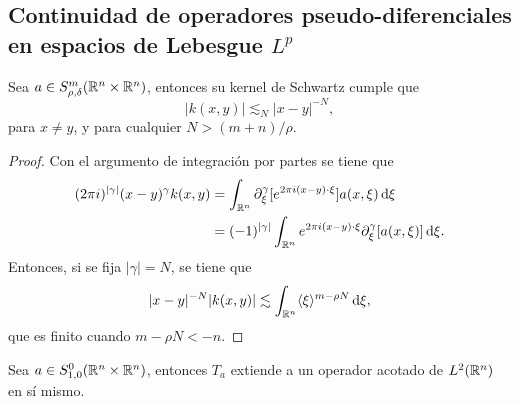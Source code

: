 \subsection{Continuidad de operadores pseudo-diferenciales en espacios de Lebesgue $L^p$}
\begin{theorem}\label{theo:kernel-estimates}
	Sea $a\in S^m_{\rho,\delta}(\mathbb{R}^n\times\mathbb{R}^n)$, entonces su kernel de Schwartz cumple que 
	\begin{equation*}
		|k(x, y)| \lesssim_N |x-y|^{-N},
	\end{equation*}
	para $x\neq y$, y para cualquier $N>(m+n)/\rho$. 
\end{theorem}
\begin{proof}
	Con el argumento de integración por partes se tiene que 
	\begin{align*}
		(2\pi i)^{|\gamma|} (x-y)^\gamma k(x, y) & = 
		\int_{\mathbb{R}^n} \partial^\gamma_\xi [e^{2\pi i (x-y)\cdot\xi}]a(x, \xi) \mathop{}\!\mathrm{d} \xi \\
		& = (-1)^{|\gamma|} \int_{\mathbb{R}^n} e^{2\pi i (x-y)\cdot\xi} \partial^\gamma_\xi [a(x, \xi)] \mathop{}\!\mathrm{d} \xi.
	\end{align*}
	Entonces, si se fija $|\gamma|=N$, se tiene que 
	\begin{equation*}
		|x-y|^{-N}|k(x, y)| \lesssim \int_{\mathbb{R}^n} \langle\xi\rangle^{m-\rho N} \mathop{}\!\mathrm{d} \xi,
	\end{equation*}
	que es finito cuando $m-\rho N < -n$.
\end{proof}
\begin{theorem}\label{theo:L2-boundedness-S0}
	Sea $a\in S^0_{1,0}(\mathbb{R}^n\times\mathbb{R}^n)$, entonces $T_a$ extiende a un operador acotado de $L^2(\mathbb{R}^n)$ en sí mismo.
\end{theorem}

